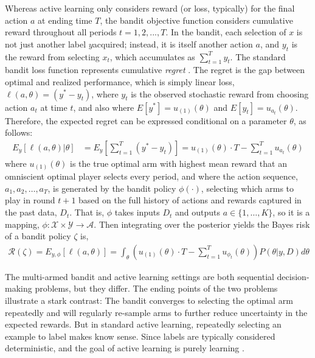 \documentclass[blindrev]{informs3} %
\newcommand{\numitems}{K}
\newcommand{\risk}{\mathcal{R}}
\begin{document}
Whereas active learning only considers reward (or loss, typically) for the final action $a$ at ending time $T$, the bandit objective function considers cumulative reward throughout all periods $t=1,2,...,T$. In the bandit, each selection of $x$ is not just another label $y$acquired; instead, it is itself another action $a$, and $y_t$ is the reward from selecting $x_t$, which accumulates as $\sum_{t=1}^{T} y_t$. The standard bandit loss function represents cumulative \emph{regret} \citep{Auer2002,LaiRobbins1985}. The regret is the gap between optimal and realized performance, which is simply linear loss, $\ell(a,\theta) = (y^{*} - y_t)$, where $y_t$ is the observed stochastic reward from choosing action $a_t$ at time $t$, and also where $E[y^{*}] = u_{(1)}(\theta)$ and $E[y_t] = u_{a_t}(\theta)$. Therefore, the expected regret can be expressed conditional on a parameter $\theta$, as follows:
\begin{align}
E_{y}\left[ \ell(a,\theta) | \theta \right] &= E_{y}\left[ \sum_{t=1}^{T} (y^{*} - y_t) \right] = u_{(1)}(\theta) \cdot T - \sum_{t=1}^{T} u_{a_t}(\theta) 
\end{align}
where $u_{(1)}(\theta)$ is the true optimal arm with highest mean reward that an omniscient optimal player selects every period, and where the action sequence, $a_1,a_2,\ldots,a_T$, is generated by the bandit policy $\phi(\cdot)$, selecting which arms to play in round $t+1$ based on the full history of actions and rewards captured in the past data, $D_t$. That is, $\phi$ takes inputs $D_{t}$ and outputs $a \in \{1,\ldots,\numitems\}$, so it is a mapping, $\phi: \mathcal{X} \times \mathcal{Y} \to \mathcal{A}$. Then integrating over the posterior yields the Bayes risk of a bandit policy $\zeta$ is,
\begin{align}
\risk(\zeta) = E_{y,\phi}\left[ \ell(a,\theta) \right] = 
\int_{\theta} \left(  u_{(1)}(\theta) \cdot T - \sum_{t=1}^{T} u_{\phi_t}(\theta) \right) P(\theta|y,D)  d\theta
\end{align}

The multi-armed bandit and active learning settings are both sequential decision-making problems, but they differ. The ending points of the two problems illustrate a stark contrast: The bandit converges to selecting the optimal arm repeatedly and will regularly re-sample arms to further reduce uncertainty in the expected rewards. But in standard active learning, repeatedly selecting an example to label makes know sense. Since labels are typically considered deterministic, and the goal of active learning is purely learning \citep{gantigray2013bridgealmab}. 
\end{document}
